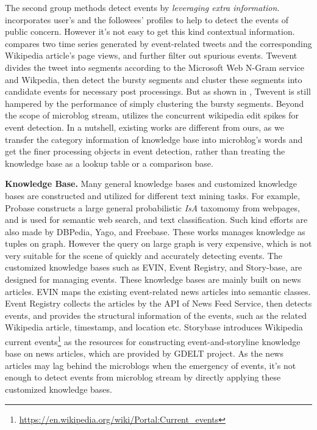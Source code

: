 \documentclass[runningheads,a4paper]{llncs}
\theoremstyle{exampstyle}
\begin{document}
The second group methods detect events by \textit{leveraging extra information}. 
\cite{huang2016efficient} incorporates user's and the followees' profiles to help to detect the events of public concern. 
However it's not easy to get this kind contextual information.
\cite{osborne2012bieber} compares two time series generated by event-related tweets and the corresponding Wikipedia article's page views, and further filter out spurious events.
Twevent \cite{Twevent2012} divides the tweet into segments according to the Microsoft Web N-Gram service and Wikpedia, then detect the bursty segments and cluster these segments into candidate events for necessary post processings.
But as shown in \cite{Yan:2015wm}, Twevent is still hampered by the performance of simply clustering the bursty segments.
Beyond the scope of microblog stream, \cite{steiner2013mj} utilizes the concurrent wikipedia edit spikes for event detection.
In a nutshell, existing works are different from ours, as we transfer the category information of knowledge base into microblog's words and get the finer processing objects in event detection, rather than treating the knowledge base as a lookup table or a comparison base.

\textbf{Knowledge Base.} Many general knowledge bases and customized knowledge bases are constructed and utilized for different text mining tasks. 
For example, Probase\cite{wu2012probase} constructs a large general probabilistic \textit{IsA} taxomomy from webpages, and is used for semantic web search, and text classification\cite{wang2014concept}.
Such kind efforts are also made by DBPedia\cite{auer2007dbpedia}, Yago\cite{suchanek2007yago}, and Freebase\cite{bollacker2008freebase}. 
These works manages knowledge as tuples on graph. 
However the query on large graph is very expensive\cite{huang2011scalable}, which is not very suitable for the scene of quickly and accurately detecting events.
The customized knowledge bases such as EVIN\cite{kuzey2014evin}, Event Registry\cite{leban2014eventRegistry}, and Story-base\cite{wu2015storybase}, are designed for managing events.
These knowledge bases are mainly built on news articles.
EVIN maps the existing event-related news articles into semantic classes. 
Event Registry collects the articles by the API of News Feed Service\cite{trampuvs2012newsfeed}, then detects events, and provides the structural information of the events, such as the related Wikipedia article, timestamp, and location etc. 
Storybase introduces Wikipedia current events\footnote{\url{https://en.wikipedia.org/wiki/Portal:Current_events}} as the resources for constructing event-and-storyline knowledge base on news articles, which are provided by GDELT project\cite{leetaru2013gdelt}.
As the news articles may lag behind the microblogs when the emergency of events, it's not enough to detect events from microblog stream by directly applying these customized knowledge bases. 
\end{document}
